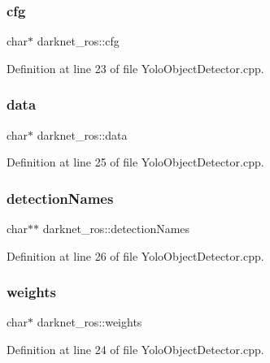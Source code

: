 \subsubsection{\texorpdfstring{cfg}{cfg}}
{\footnotesize\ttfamily char$\ast$ darknet\+\_\+ros\+::cfg}



Definition at line 23 of file Yolo\+Object\+Detector.\+cpp.

\mbox{\label{namespacedarknet__ros_a1647c10e0e841a6a137fff4f9df7c1d7}} 
\subsubsection{\texorpdfstring{data}{data}}
{\footnotesize\ttfamily char$\ast$ darknet\+\_\+ros\+::data}



Definition at line 25 of file Yolo\+Object\+Detector.\+cpp.

\mbox{\label{namespacedarknet__ros_ae35d4964f842a9cd96ed82479484f7f2}} 
\subsubsection{\texorpdfstring{detectionNames}{detectionNames}}
{\footnotesize\ttfamily char$\ast$$\ast$ darknet\+\_\+ros\+::detection\+Names}



Definition at line 26 of file Yolo\+Object\+Detector.\+cpp.

\mbox{\label{namespacedarknet__ros_a9219776bc505d5963fc6920fbe7697e8}} 
\subsubsection{\texorpdfstring{weights}{weights}}
{\footnotesize\ttfamily char$\ast$ darknet\+\_\+ros\+::weights}



Definition at line 24 of file Yolo\+Object\+Detector.\+cpp.

